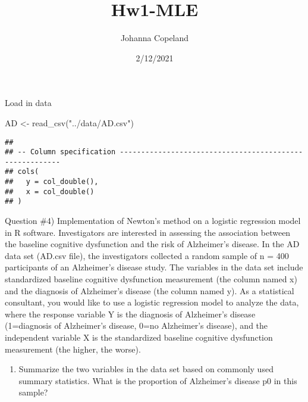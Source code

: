 \documentclass[
]{article}
\title{Hw1-MLE}
\author{Johanna Copeland}
\date{2/12/2021}
\newenvironment{Shaded}{\begin{snugshade}}{\end{snugshade}}
\newcommand{\FunctionTok}[1]{\textcolor[rgb]{0.00,0.00,0.00}{#1}}
\newcommand{\NormalTok}[1]{#1}
\newcommand{\OtherTok}[1]{\textcolor[rgb]{0.56,0.35,0.01}{#1}}
\newcommand{\SpecialCharTok}[1]{\textcolor[rgb]{0.00,0.00,0.00}{#1}}
\newcommand{\StringTok}[1]{\textcolor[rgb]{0.31,0.60,0.02}{#1}}
\providecommand{\tightlist}{%
  \setlength{\itemsep}{0pt}\setlength{\parskip}{0pt}}
\begin{document}
\maketitle

Load in data

\begin{Shaded}
\begin{Highlighting}[]
\NormalTok{AD }\OtherTok{\textless{}{-}} \FunctionTok{read\_csv}\NormalTok{(}\StringTok{"../data/AD.csv"}\NormalTok{)}
\end{Highlighting}
\end{Shaded}

\begin{verbatim}
## 
## -- Column specification --------------------------------------------------------
## cols(
##   y = col_double(),
##   x = col_double()
## )
\end{verbatim}

Question \#4) Implementation of Newton's method on a logistic regression
model in R software. Investigators are interested in assessing the
association between the baseline cognitive dysfunction and the risk of
Alzheimer's disease. In the AD data set (AD.csv file), the investigators
collected a random sample of n = 400 participants of an Alzheimer's
disease study. The variables in the data set include standardized
baseline cognitive dysfunction measurement (the column named x) and the
diagnosis of Alzheimer's disease (the column named y). As a statistical
consultant, you would like to use a logistic regression model to analyze
the data, where the response variable Y is the diagnosis of Alzheimer's
disease (1=diagnosis of Alzheimer's disease, 0=no Alzheimer's disease),
and the independent variable X is the standardized baseline cognitive
dysfunction measurement (the higher, the worse).

\begin{enumerate}
\def\labelenumi{\alph{enumi})}
\tightlist
\item
  Summarize the two variables in the data set based on commonly used
  summary statistics. What is the proportion of Alzheimer's disease p0
  in this sample?
\end{enumerate}

\begin{Shaded}
\end{Shaded}
\end{document}
